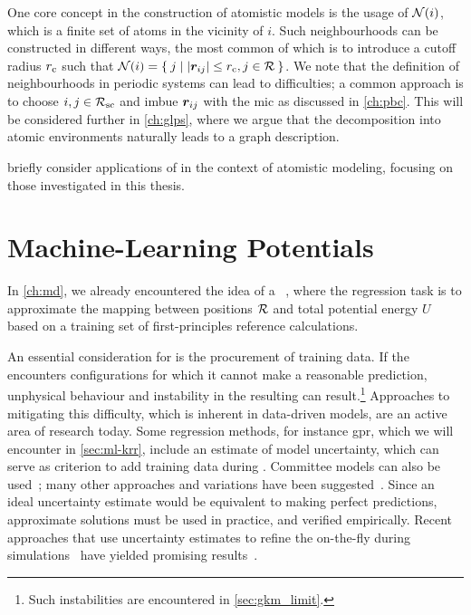 One core concept in the construction of atomistic \ml models is the usage of  $\mathcal{N}(i)$, which is a finite set of atoms in the vicinity of $i$. Such neighbourhoods can be constructed in different ways, the most common of which is to introduce a cutoff radius $r_{\text{c}}$ such that $\nbh{i} = \curlyset{j}{\magnitude{\R_{ij}} \leq \cutoff, j \in \Rgen}$. We note that the definition of neighbourhoods in periodic systems can lead to difficulties; a common approach is to choose $i,j \in \mathcal{R_{\text{sc}}}$ and imbue $\boldsymbol{r}_{ij}$ with the \gls{mic} as discussed in \cref{ch:pbc}. This will be considered further in \cref{ch:glps}, where we argue that the decomposition into atomic environments naturally leads to a graph description.

\clearpage
 briefly consider applications of \ml in the context of atomistic modeling, focusing on those investigated in this thesis.

\section{Machine-Learning Potentials}
\label{sec:ml-mlps}


In \cref{ch:md}, we already encountered the idea of a ~\cite{lgs2004q,lhsr2006q,bp2007q,bpkc2010q,lgs2004q,bp2007q,ukkm2020q,uctm2021q,pt2021q}, where the regression task is to approximate the mapping between positions $\mathcal{R}$ and total potential energy $U$ based on a training set of first-principles reference calculations.

An essential consideration for \mlps is the procurement of training data. If the \mlp encounters configurations for which it cannot make a reasonable prediction, unphysical behaviour and instability in the resulting \md can result.\footnote{Such instabilities are encountered in \cref{sec:gkm_limit}.} Approaches to mitigating this difficulty, which is inherent in data-driven models, are an active area of research today. Some regression methods, for instance \gls{gpr}, which we will encounter in \cref{sec:ml-krr}, include an estimate of model uncertainty, which can serve as criterion to add training data during \md. Committee models can also be used~\cite{b2015q,pck2017q,tudg2023a}; many other approaches and variations have been suggested~\cite{izgc2021q,stg2021q,pdjm2022q}. Since an ideal uncertainty estimate would be equivalent to making perfect predictions, approximate solutions must be used in practice, and verified empirically. Recent approaches that use uncertainty estimates to refine the \pes on-the-fly during \md simulations~\cite{capd2004q} have yielded promising results~\cite{jmka2020q,vkjk2021q,osoc2022a,xvjk2022a,cmhm2023a}.

